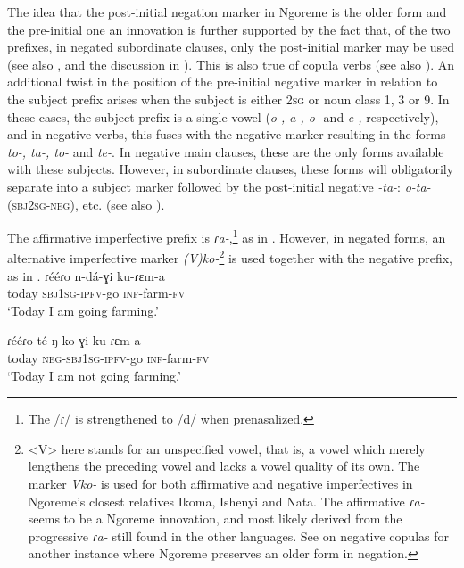 \documentclass[output=paper,colorlinks,citecolor=brown,draftmode]{langscibook}
\begin{document}
The idea that the post-initial negation marker in Ngoreme is the older form and the pre-initial one an innovation is further supported by the fact that, of the two prefixes, in negated subordinate clauses, only the post-initial marker may be used (see also ,  and the discussion in ). 
This is also true of copula verbs (see also ). An additional twist in the position of the pre-initial negative marker in relation to the subject prefix arises when the subject is either 2\textsc{sg} or noun class 1, 3 or 9. In these cases, the subject prefix is a single vowel (\textit{o-, a-, o-} and \textit{e-,} respectively), and in negative verbs, this fuses with the negative marker resulting in the forms \textit{to-, ta-, to-} and \textit{te-}. In negative main clauses, these are the only forms available with these subjects. However, in subordinate clauses, these forms will obligatorily separate into a subject marker followed by the post-initial negative \textit{{}-ta-}: \textit{o-ta-} (\textsc{sbj2sg-neg),} etc. (see also ).

The affirmative imperfective prefix is \textit{ɾa-},\footnote{The /ɾ/ is strengthened to /d/ when prenasalized.} as in . However, in negated forms, an alternative imperfective marker \textit{(V)ko-}\footnote{<V> here stands for an unspecified vowel, that is, a vowel which merely lengthens the preceding vowel and lacks a vowel quality of its own. The marker \textit{Vko-} is used for both affirmative and negative imperfectives in Ngoreme’s closest relatives Ikoma, Ishenyi and Nata. The affirmative \textit{ɾa-} seems to be a Ngoreme innovation, and most likely derived from the progressive \textit{ɾa-} still found in the other languages. See  on negative copulas for another instance where Ngoreme preserves an older form in negation.} is used together with the negative prefix, as in . 
\ea\label{ex:ngo:6} 
     \gll ɾééɾo n{}-dá{}-ɣi ku{}-ɾɛm{}-a\\ 
        today \textsc{sbj1sg-ipfv}{}-go \textsc{inf}{}-farm-\textsc{fv}\\
    \glt ‘Today I am going farming.’
\z 
 
\ea\label{ex:ngo:7} 
    \gll ɾééɾo té{}-ŋ{}-ko{}-ɣi ku{}-ɾɛm{}-a \\ 
     today \textsc{neg-sbj1sg-ipfv}{}-go \textsc{inf}{}-farm-\textsc{fv}\\
    \glt ‘Today I am not going farming.’
\z 
\end{document}
